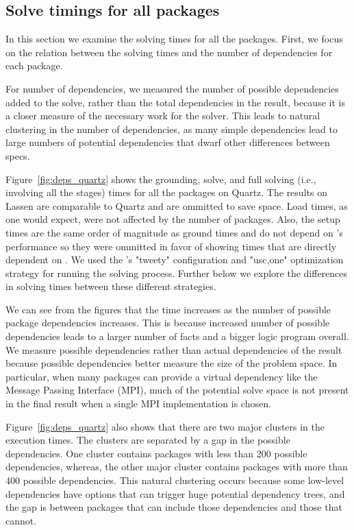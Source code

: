 \subsection{Solve timings for all packages}

In this section we examine the solving times for all the packages. First, we focus on the relation between the solving times and the number of dependencies for each package.

For number of dependencies, we measured the number of possible
dependencies added to the solve, rather than the total dependencies in
the result, because it is a closer measure of the necessary work for
the solver. This leads to natural clustering in the number of
dependencies, as many simple dependencies lead to large numbers of
potential dependencies that dwarf other differences between specs.

Figure~\ref{fig:deps_quartz} shows the grounding, solve, and full solving (i.e., involving all the stages) times for all the packages on Quartz. The results on Lassen are comparable to Quartz and are ommitted to save space. Load times, as one would expect, were not affected by the number of packages. Also, the setup times are the same order of magnitude as ground times and do not depend on \clingo{}'s performance so they were ommitted in favor of showing times that are directly dependent on \clingo{}. We used the \clingo{}'s "tweety" configuration and "usc,one" optimization strategy for running the solving process. Further below we explore the differences in solving times between these different strategies.

We can see from the figures that the time increases as the number of possible package dependencies increases. This is because increased number of possible dependencies leads to a larger number of facts and a bigger logic program overall. We measure possible dependencies rather than actual dependencies of the result because possible dependencies better measure the size of the problem space. In particular, when many packages can provide a virtual dependency like the Message Passing Interface (MPI), much of the potential solve space is not present in the final result when a single MPI implementation is chosen.

Figure~\ref{fig:deps_quartz} also shows that there are two major clusters in the execution times. The clusters are separated by a gap in the possible dependencies. One cluster contains packages with less than 200 possible dependencies, whereas, the other major cluster contains packages with more than 400 possible dependencies. This natural clustering occurs because some low-level dependencies have options that can trigger huge potential dependency trees, and the gap is between packages that can include those dependencies and those that cannot.

